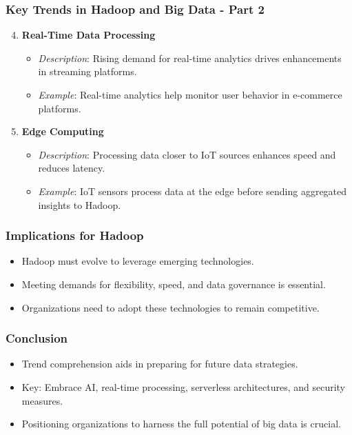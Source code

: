 \documentclass[aspectratio=169]{beamer}
\begin{document}
\begin{frame}[fragile]
    \frametitle{Key Trends in Hadoop and Big Data - Part 2}
    \begin{enumerate}
        \setcounter{enumi}{3} %
        \item \textbf{Real-Time Data Processing}
        \begin{itemize}
            \item \textit{Description}: Rising demand for real-time analytics drives enhancements in streaming platforms.
            \item \textit{Example}: Real-time analytics help monitor user behavior in e-commerce platforms.
        \end{itemize}

        \item \textbf{Edge Computing}
        \begin{itemize}
            \item \textit{Description}: Processing data closer to IoT sources enhances speed and reduces latency.
            \item \textit{Example}: IoT sensors process data at the edge before sending aggregated insights to Hadoop.
        \end{itemize}
    \end{enumerate}
\end{frame}

\begin{frame}[fragile]
    \frametitle{Implications for Hadoop}
    \begin{itemize}
        \item Hadoop must evolve to leverage emerging technologies.
        \item Meeting demands for flexibility, speed, and data governance is essential.
        \item Organizations need to adopt these technologies to remain competitive.
    \end{itemize}
\end{frame}

\begin{frame}[fragile]
    \frametitle{Conclusion}
    \begin{itemize}
        \item Trend comprehension aids in preparing for future data strategies.
        \item Key: Embrace AI, real-time processing, serverless architectures, and security measures.
        \item Positioning organizations to harness the full potential of big data is crucial.
    \end{itemize}
\end{frame}
\end{document}

